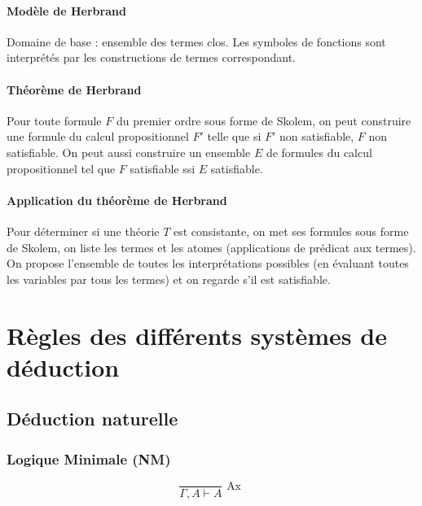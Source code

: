 \documentclass[french]{article}
\begin{document}
\paragraph{Modèle de Herbrand} Domaine de base : ensemble des termes clos. Les symboles de fonctions sont interprétés par les constructions de termes correspondant.

\paragraph{Théorème de Herbrand} Pour toute formule $F$ du premier ordre sous forme de Skolem, on peut construire une formule du calcul propositionnel $F'$ telle que si $F'$ non satisfiable, $F$ non satisfiable. On peut aussi construire un ensemble $E$ de formules du calcul propositionnel tel que $F$ satisfiable ssi $E$ satisfiable.

\paragraph{Application du théorème de Herbrand}
Pour déterminer si une théorie $T$ est consistante, on met ses formules sous forme de Skolem, on liste les termes et les atomes (applications de prédicat aux termes). On propose l'ensemble de toutes les interprétations possibles (en évaluant toutes les variables par tous les termes) et on regarde s'il est satisfiable.

\newpage
\appendix

\section{Règles des différents systèmes de déduction}

\subsection{Déduction naturelle}

\subsubsection{Logique Minimale (NM)}

\[\dfrac{}{\Gamma,A\vdash A} \text{ Ax }\]
\end{document}
